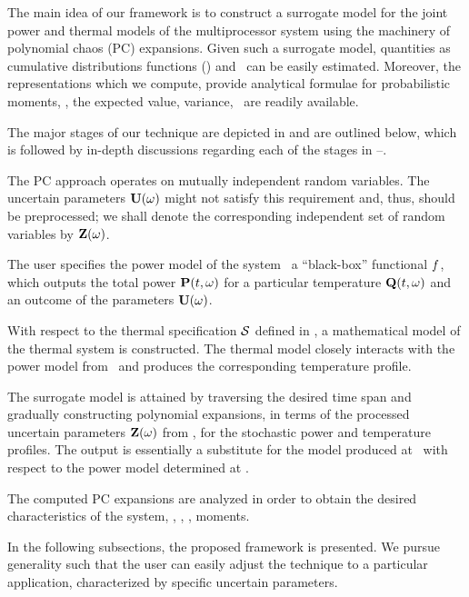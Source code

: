 
The main idea of our framework is to construct a surrogate model for the joint power and thermal models of the multiprocessor system using the machinery of polynomial chaos (PC) expansions.
Given such a surrogate model, quantities as cumulative distributions functions (\cdfs) and \pdfs\ can be easily estimated. Moreover, the representations which we compute, provide analytical formulae for probabilistic moments, \ie, the expected value, variance, \etc\ are readily available.

The major stages of our technique are depicted in  and are outlined below, which is followed by in-depth discussions regarding each of the stages in --.

The PC approach operates on mutually independent random variables. The uncertain parameters $\mathbf{U}(\omega)$ might not satisfy this requirement and, thus, should be preprocessed; we shall denote the corresponding independent set of random variables by $\mathbf{Z}(\omega)$.

The user specifies the power model of the system \via\ a ``black-box'' functional $f$, which outputs the total power $\mathbf{P}(t, \omega)$ for a particular temperature $\mathbf{Q}(t, \omega)$ and an outcome of the parameters $\mathbf{U}(\omega)$.

With respect to the thermal specification $\mathcal{S}$ defined in , a mathematical model of the thermal system is constructed.
The thermal model closely interacts with the power model from \ and produces the corresponding temperature profile.

The surrogate model is attained by traversing the desired time span and gradually constructing polynomial expansions, in terms of the processed uncertain parameters $\mathbf{Z}(\omega)$ from , for the stochastic power and temperature profiles.
The output is essentially a substitute for the model produced at \ with respect to the power model determined at .

The computed PC expansions are analyzed in order to obtain the desired characteristics of the system, \eg, \cdfs, \pdfs, moments.

In the following subsections, the proposed framework is presented. We pursue generality such that the user can easily adjust the technique to a particular application, characterized by specific uncertain parameters.

